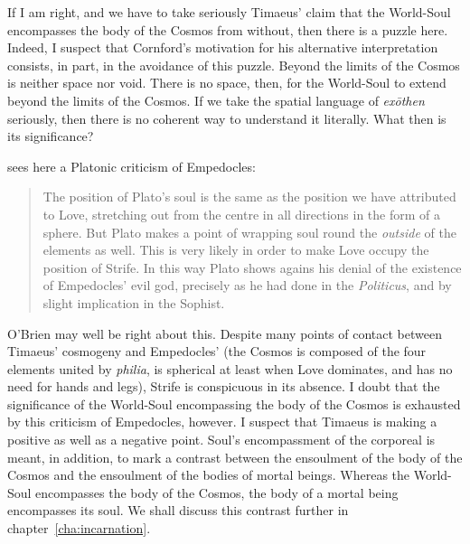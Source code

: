 If I am right, and we have to take seriously Timaeus' claim that the World-Soul encompasses the body of the Cosmos from without, then there is a puzzle here. Indeed, I suspect that Cornford's motivation for his alternative interpretation consists, in part, in the avoidance of this puzzle. Beyond the limits of the Cosmos is neither space nor void. There is no space, then, for the World-Soul to extend beyond the limits of the Cosmos. If we take the spatial language of \emph{exōthen} seriously, then there is no coherent way to understand it literally. What then is its significance? 

\citet[144--5]{OBrien:1969ty} sees here a Platonic criticism of Empedocles:
\begin{quote}
	The position of Plato's soul is the same as the position we have attributed to Love, stretching out from the centre in all directions in the form of a sphere. But Plato makes a point of wrapping soul round the \emph{outside} of the elements as well. This is very likely in order to make Love occupy the position of Strife. In this way Plato shows agains his denial of the existence of Empedocles' evil god, precisely as he had done in the \emph{Politicus}, and by slight implication in the Sophist. \citep[145]{OBrien:1969ty}
\end{quote}
O'Brien may well be right about this. Despite many points of contact between Timaeus' cosmogeny and Empedocles' (the Cosmos is composed of the four elements united by \emph{philia}, is spherical at least when Love dominates, and has no need for hands and legs), Strife is conspicuous in its absence. I doubt that the significance of the World-Soul encompassing the body of the Cosmos is exhausted by this criticism of Empedocles, however. I suspect that Timaeus is making a positive as well as a negative point. Soul's encompassment of the corporeal is meant, in addition, to mark a contrast between the ensoulment of the body of the Cosmos and the ensoulment of the bodies of mortal beings. Whereas the World-Soul encompasses the body of the Cosmos, the body of a mortal being encompasses its soul. We shall discuss this contrast further in chapter~\ref{cha:incarnation}.

